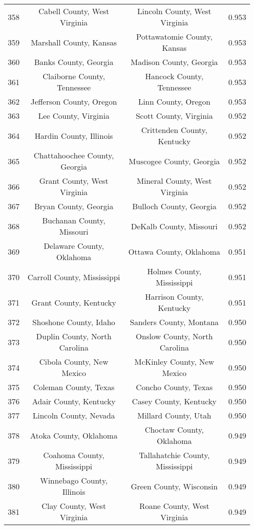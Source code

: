\begin{longtable}{cccc}
  358 & Cabell County, West Virginia & Lincoln County, West Virginia & 0.953 \\ 
  359 & Marshall County, Kansas & Pottawatomie County, Kansas & 0.953 \\ 
  360 & Banks County, Georgia & Madison County, Georgia & 0.953 \\ 
  361 & Claiborne County, Tennessee & Hancock County, Tennessee & 0.953 \\ 
  362 & Jefferson County, Oregon & Linn County, Oregon & 0.953 \\ 
  363 & Lee County, Virginia & Scott County, Virginia & 0.952 \\ 
  364 & Hardin County, Illinois & Crittenden County, Kentucky & 0.952 \\ 
  365 & Chattahoochee County, Georgia & Muscogee County, Georgia & 0.952 \\ 
  366 & Grant County, West Virginia & Mineral County, West Virginia & 0.952 \\ 
  367 & Bryan County, Georgia & Bulloch County, Georgia & 0.952 \\ 
  368 & Buchanan County, Missouri & DeKalb County, Missouri & 0.952 \\ 
  369 & Delaware County, Oklahoma & Ottawa County, Oklahoma & 0.951 \\ 
  370 & Carroll County, Mississippi & Holmes County, Mississippi & 0.951 \\ 
  371 & Grant County, Kentucky & Harrison County, Kentucky & 0.951 \\ 
  372 & Shoshone County, Idaho & Sanders County, Montana & 0.950 \\ 
  373 & Duplin County, North Carolina & Onslow County, North Carolina & 0.950 \\ 
  374 & Cibola County, New Mexico & McKinley County, New Mexico & 0.950 \\ 
  375 & Coleman County, Texas & Concho County, Texas & 0.950 \\ 
  376 & Adair County, Kentucky & Casey County, Kentucky & 0.950 \\ 
  377 & Lincoln County, Nevada & Millard County, Utah & 0.950 \\ 
  378 & Atoka County, Oklahoma & Choctaw County, Oklahoma & 0.949 \\ 
  379 & Coahoma County, Mississippi & Tallahatchie County, Mississippi & 0.949 \\ 
  380 & Winnebago County, Illinois & Green County, Wisconsin & 0.949 \\ 
  381 & Clay County, West Virginia & Roane County, West Virginia & 0.949 \\ 

\end{longtable}
